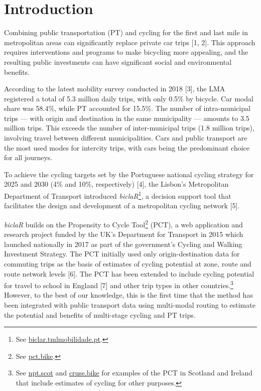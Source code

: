 \documentclass[runningheads]{llncs}
\begin{document}
\hypertarget{introduction}{%
\section{Introduction}\label{introduction}}

Combining public transportation (PT) and cycling for the first and last
mile in metropolitan areas can significantly replace private car trips
{[}1, 2{]}. This approach requires interventions and programs to make
bicycling more appealing, and the resulting public investments can have
significant social and environmental benefits.

According to the latest mobility survey conducted in 2018 {[}3{]}, the
LMA registered a total of 5.3 million daily trips, with only 0.5\% by
bicycle. Car modal share was 58.4\%, while PT accounted for 15.5\%. The
number of intra-municipal trips --- with origin and destination in the
same municipality --- amounts to 3.5 million trips. This exceeds the
number of inter-municipal trips (1.8 million trips), involving travel
between different municipalities. Cars and public transport are the most
used modes for intercity trips, with cars being the predominant choice
for all journeys.

To achieve the cycling targets set by the Portuguese national cycling
strategy for 2025 and 2030 (4\% and 10\%, respectively) {[}4{]}, the
Lisbon's Metropolitan Department of Transport introduced
\emph{biclaR}\footnote{See
  \href{https://biclar.tmlmobilidade.pt/}{biclar.tmlmobilidade.pt}.}, a
decision support tool that facilitates the design and development of a
metropolitan cycling network {[}5{]}.

\emph{biclaR} builds on the Propensity to Cycle Tool\footnote{See
  \href{https://www.pct.bike/}{pct.bike}.} (PCT), a web application and
research project funded by the UK's Department for Transport in 2015
which launched nationally in 2017 as part of the government's Cycling
and Walking Investment Strategy. The PCT initially used only
origin-destination data for commuting trips as the basis of estimates of
cycling potential at zone, route and route network levels {[}6{]}. The
PCT has been extended to include cycling potential for travel to school
in England {[}7{]} and other trip types in other countries.\footnote{See
  \href{https://www.npt.scot}{npt.scot} and
  \href{https://cruse.bike}{cruse.bike} for examples of the PCT in
  Scotland and Ireland that include estimates of cycling for other
  purposes.} However, to the best of our knowledge, this is the first
time that the method has been integrated with public transport data
using multi-modal routing to estimate the potential and benefits of
multi-stage cycling and PT trips.
\end{document}
